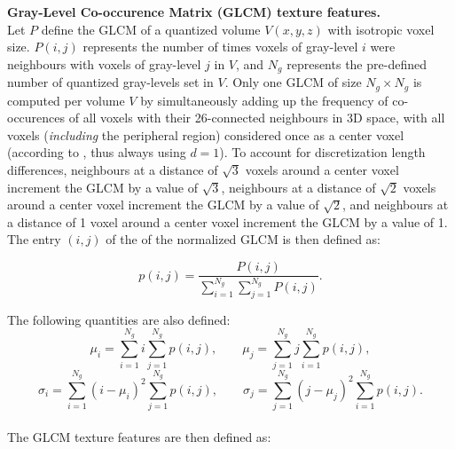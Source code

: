\documentclass{article}
\begin{document}
\noindent \textbf{Gray-Level Co-occurence Matrix (GLCM) texture features.} \\
Let $P$ define the GLCM of a quantized volume $V(x,y,z)$ with isotropic voxel size. $P(i,j)$ represents the number of times voxels of gray-level $i$ were neighbours with voxels of gray-level $j$ in $V$, and $N_g$ represents the pre-defined number of quantized gray-levels set in $V$. Only one GLCM of size $N_g \times N_g$ is computed per volume $V$ by simultaneously adding up the frequency of co-occurences of all voxels with their 26-connected neighbours in 3D space, with all voxels (\textit{including} the peripheral region) considered once as a center voxel (according to \cite{HaralickRM1973}, thus always using $d=1$). To account for discretization length differences, neighbours at a distance of $\sqrt{3}$ voxels around a center voxel increment the GLCM by a value of $\sqrt{3}$, neighbours at a distance of $\sqrt{2}$ voxels around a center voxel increment the GLCM by a value of $\sqrt{2}$, and neighbours at a distance of 1 voxel around a center voxel increment the GLCM by a value of 1. The entry $(i,j)$ of the of the normalized GLCM is then defined as:

\[p(i,j) = \frac{P(i,j)}{\sum_{i=1}^{N_g}\sum_{j=1}^{N_g} P(i,j)}.\]

\noindent The following quantities are also defined:
\[\mu_i = \sum_{i=1}^{N_g} i \sum_{j=1}^{N_g} p(i,j), \qquad \mu_j = \sum_{j=1}^{N_g} j \sum_{i=1}^{N_g} p(i,j),\]
\[\sigma_i = \sum_{i=1}^{N_g} (i-\mu_i)^2 \sum_{j=1}^{N_g} p(i,j), \qquad \sigma_j = \sum_{j=1}^{N_g} (j-\mu_j)^2 \sum_{i=1}^{N_g} p(i,j).\] \\

\noindent The GLCM texture features are then defined as:
\end{document}
